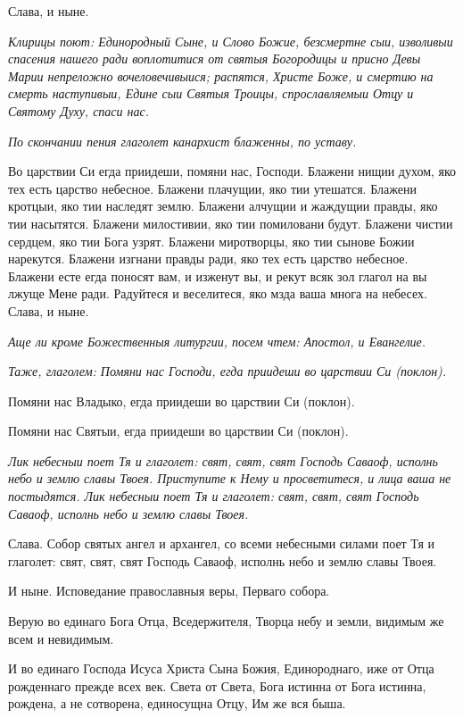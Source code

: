 Слава, и ныне.


\itshape Клирицы поют:\normalfont{} Единородный Сыне, и Слово Божие, безсмертне сыи, изволивыи спасения нашего ради воплотитися от святыя Богородицы и присно Девы Марии непреложно вочеловечивыися; распятся, Христе Боже, и смертию на смерть наступивыи, Едине сыи Святыя Троицы, спрославляемыи Отцу и Святому Духу, спаси нас.


\itshape По скончании пения глаголет канархист блаженны, по уставу.\normalfont{}


Во царствии Си егда приидеши, помяни нас, Господи. Блажени нищии духом, яко тех есть царство небесное. Блажени плачущии, яко тии утешатся. Блажени кротцыи, яко тии наследят землю. Блажени алчущии и жаждущии правды, яко тии насытятся. Блажени милостивии, яко тии помиловани будут. Блажени чистии сердцем, яко тии Бога узрят. Блажени миротворцы, яко тии сынове Божии нарекутся. Блажени изгнани правды ради, яко тех есть царство небесное. Блажени есте егда поносят вам, и изженут вы, и рекут всяк зол глагол на вы лжуще Мене ради. Радуйтеся и веселитеся, яко мзда ваша многа на небесех. Слава, и ныне.


\itshape Аще ли кроме Божественныя литургии, посем чтем:\normalfont{} Апостол, и Евангелие.


\itshape Таже, глаголем:\normalfont{} Помяни нас Господи, егда приидеши во царствии Си (поклон).

Помяни нас Владыко, егда приидеши во царствии Си (поклон).

Помяни нас Святыи, егда приидеши во царствии Си (поклон).


\itshape Лик небесныи поет Тя и глаголет:\normalfont{} свят, свят, свят Господь Саваоф, исполнь небо и землю славы Твоея. Приступите к Нему и просветитеся, и лица ваша не постыдятся. Лик небесныи поет Тя и глаголет: свят, свят, свят Господь Саваоф, исполнь небо и землю славы Твоея. 

Слава. Собор святых ангел и архангел, со всеми небесными силами поет Тя и глаголет: свят, свят, свят Господь Саваоф, исполнь небо и землю славы Твоея. 

И ныне. Исповедание православныя веры, Перваго собора.

Верую во единаго Бога Отца, Вседержителя, Творца небу и земли, видимым же всем и невидимым.

И во единаго Господа Исуса Христа Сына Божия, Единороднаго, иже от Отца рожденнаго прежде всех век. Света от Света, Бога истинна от Бога истинна, рождена, а не сотворена, единосущна Отцу, Им же вся быша.

